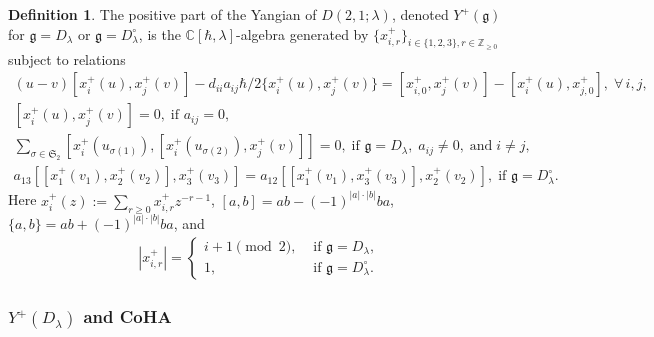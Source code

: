 \documentclass[10pt]{amsart}
\theoremstyle{definition}
\newtheorem{Definition}[Theorem]{Definition}
\numberwithin{equation}{section}
\newcommand{\bC}{\mathbb{C}}
\newcommand{\bZ}{\mathbb{Z}}
\begin{document}
\begin{Definition}\label{def Y^+(D(2,1;a))}
The positive part of the Yangian of $D(2,1;\lambda)$, denoted $Y^+(\mathfrak{g})$ for $\mathfrak{g}=D_\lambda$ or $\mathfrak{g}=D^\circ_\lambda$, is the $\bC[\hbar,\lambda]$-algebra generated by $\{x^+_{i,r}\}_{i\in \{1,2,3\},r\in \bZ_{\geqslant 0}}$ subject to relations
\begin{equation}\label{relation for Y^+(D(2,1;a))}
\begin{gathered}
(u-v)[x^+_i(u),x^+_j(v)]-d_{ii}a_{ij}\hbar/2\{x^+_i(u),x^+_j(v)\}=[x^+_{i,0},x^+_j(v)]-[x^+_i(u),x^+_{j,0}],\;\forall \, i,j,\\
[x^+_i(u),x^+_j(v)]=0,\;\text{if }a_{ij}=0,\\
\sum_{\sigma\in \mathfrak{S}_2} [x^+_i(u_{\sigma(1)}),[x^+_i(u_{\sigma(2)}),x^+_j(v)]]=0,\; \text{if }\mathfrak{g}=D_\lambda,\; a_{ij}\neq 0,\;\text{and}\;i\neq j,\\
a_{13}[[x^+_1(v_1),x^+_2(v_2)],x^+_3(v_3)]=a_{12}[[x^+_1(v_1),x^+_3(v_3)],x^+_2(v_2)],\; \text{if }\mathfrak{g}=D^\circ_\lambda.
\end{gathered}
\end{equation}
Here $x^+_i(z):=\sum_{r\geqslant 0}x^+_{i,r}z^{-r-1}$, $[a,b]=ab-(-1)^{|a|\cdot|b|}ba$, $\{a,b\}=ab+(-1)^{|a|\cdot|b|}ba$, and
\begin{align*}
|x^+_{i,r}|=\begin{cases}
i+1 \pmod{2},&\text{ if }\mathfrak{g}=D_\lambda,\\
1, &\text{ if }\mathfrak{g}=D_\lambda^\circ.
\end{cases}
\end{align*}
\end{Definition} 

\subsubsection{\texorpdfstring{$Y^+(D_\lambda)$}{Y(D)} and CoHA}\label{sec quiver for D(2,1)}
\end{document}
